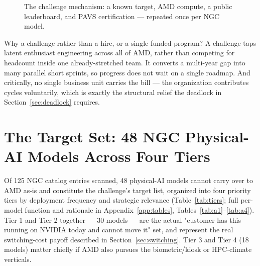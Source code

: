 \documentclass[blind]{gtac}
\begin{document}
\begin{figure}[H]
\centering
{}
\caption{The challenge mechanism: a known target, AMD compute, a public leaderboard, and PAVS certification --- repeated once per NGC model.}
\label{fig:mechanism}
\end{figure}

Why a challenge rather than a hire, or a single funded program? A challenge taps latent enthusiast engineering across all of AMD, rather than competing for headcount inside one already-stretched team. It converts a multi-year gap into many parallel short sprints, so progress does not wait on a single roadmap. And critically, no single business unit carries the bill --- the organization contributes cycles voluntarily, which is exactly the structural relief the deadlock in Section~\ref{sec:deadlock} requires.

\section{The Target Set: 48 NGC Physical-AI Models Across Four Tiers}
\label{sec:targets}

Of 125 NGC catalog entries scanned, 48 physical-AI models cannot carry over to AMD as-is and constitute the challenge's target list, organized into four priority tiers by deployment frequency and strategic relevance (Table~\ref{tab:tiers}; full per-model function and rationale in Appendix~\ref{app:tables}, Tables~\ref{tab:a1}--\ref{tab:a4}). Tier 1 and Tier 2 together --- 30 models --- are the actual "customer has this running on NVIDIA today and cannot move it" set, and represent the real switching-cost payoff described in Section~\ref{sec:switching}. Tier 3 and Tier 4 (18 models) matter chiefly if AMD also pursues the biometric/kiosk or HPC-climate verticals.
\end{document}
